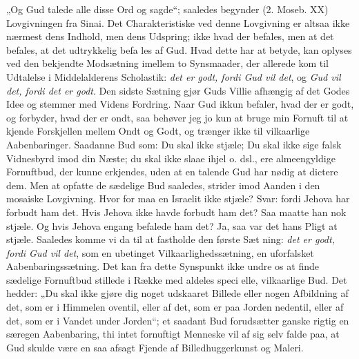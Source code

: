 \documentclass[12pt]{book}
\newcommand{\opage}[1]{\marginnote{\footnotesize\textit{[#1]}}}
\begin{document}
„Og Gud talede alle disse Ord og sagde“; saaledes
begynder (2. Moseb. XX) Lovgivningen fra Sinai. Det
Charakteristiske ved denne Lovgivning er altsaa ikke
nærmest dens Indhold, men dens Udspring; ikke hvad
der befales, men at det befales, at det udtrykkelig befa\-%
les af Gud. Hvad dette har at betyde, kan oplyses ved
den bekjendte Modsætning imellem to Synsmaader, der
\opage{179}\setcounter{footnote}{0}%
allerede kom til Udtalelse i Middelalderens Scholastik:
\textit{det er godt, fordi Gud vil det}, og \textit{Gud vil det, fordi det
er godt}. Den sidste Sætning gjør Guds Villie afhængig
af det Godes Idee og stemmer med Videns Fordring.
Naar Gud ikkun befaler, hvad der er godt, og forbyder,
hvad der er ondt, saa behøver jeg jo kun at bruge
min Fornuft til at kjende Forskjellen mellem Ondt og
Godt, og trænger ikke til vilkaarlige Aabenbaringer.
Saadanne Bud som: Du skal ikke stjæle; Du skal ikke
sige falsk Vidnesbyrd imod din Næste; du skal ikke
slaae ihjel o. dsl., ere almeengyldige Fornuftbud, der
kunne erkjendes, uden at en talende Gud har nødig at
dictere dem. Men at opfatte de sædelige Bud saaledes,
strider imod Aanden i den mosaiske Lovgivning. Hvor\-%
for maa en Israelit ikke stjæle? Svar: fordi Jehova har
forbudt ham det. Hvis Jehova ikke havde forbudt ham
det? Saa maatte han nok stjæle. Og hvis Jehova engang
befalede ham det? Ja, saa var det hans Pligt at stjæle.
Saaledes komme vi da til at fastholde den første Sæt\-%
ning: \textit{det er godt, fordi Gud vil det}, som en ubetinget
Vilkaarlighedssætning, en uforfalsket Aabenbaringssætning.
Det kan fra dette Synspunkt ikke undre os at finde
sædelige Fornuftbud stillede i Række med aldeles speci\-%
elle, vilkaarlige Bud. Det hedder: „Du skal ikke gjøre
dig noget udskaaret Billede eller nogen Afbildning af
det, som er i Himmelen oventil, eller af det, som er paa
Jorden nedentil, eller af det, som er i Vandet under
Jorden“; et saadant Bud forudsætter ganske rigtig en
særegen Aabenbaring, thi intet fornuftigt Menneske vil
af sig selv falde paa, at Gud skulde være en saa afsagt
Fjende af Billedhuggerkunst og Maleri.
\end{document}
